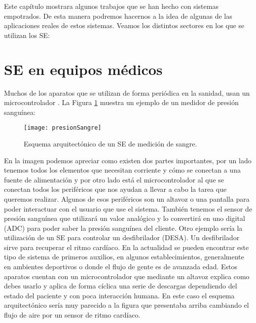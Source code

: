 \label{cap:trabajosRelacionados}

Este capítulo mostrara algunos trabajos que se han hecho con sistemas empotrados. De esta manera podremos hacernos a la idea de algunas de las aplicaciones reales de estos sistemas. Veamos los distintos sectores en los que se utilizan los SE:

\section{SE en equipos médicos}\label{sec:TREquiposMedicos}

Muchos de los aparatos que se utilizan de forma periódica en la sanidad, usan un microcontrolador \cite{medicinaSE}. La Figura \ref{PresionSanguinea} muestra un ejemplo de un medidor de presión sanguínea:

\begin{figure}[!h]
	\centering
	\texttt{[image: presionSangre]}
	\caption{Esquema arquitectónico de un SE de medición de sangre.}\label{PresionSanguinea}
\end{figure}

En la imagen podemos apreciar como existen dos partes importantes, por un lado tenemos todos los elementos que necesitan corriente y cómo se conectan a una fuente de alimentación y por otro lado está el microcontrolador al que se conectan todos los periféricos que nos ayudan a llevar a cabo la tarea que queremos realizar. Algunos de esos periféricos son un altavoz o una pantalla para poder interactuar con el usuario que use el sistema. También tenemos el sensor de presión sanguínea que utilizará un valor analógico y lo convertirá en uno digital (ADC) para poder saber la presión sanguínea del cliente.
Otro ejemplo sería la utilización de un SE para controlar un desfibrilador (DESA). Un desfibrilador sirve para recuperar el ritmo cardíaco. En la actualidad se pueden encontrar este tipo de sistema de primeros auxilios, en algunos establecimientos, generalmente en ambientes deportivos o donde el flujo de gente es de avanzada edad. Estos aparatos cuentan con un microcontrolador que mediante un altavoz explica como debes usarlo y aplica de forma cíclica una serie de descargas dependiendo del estado del paciente y con poca interacción humana. En este caso el esquema arquitectónico sería muy parecido a la figura que presentaba arriba cambiando el flujo de aire por un sensor de ritmo cardíaco. 

